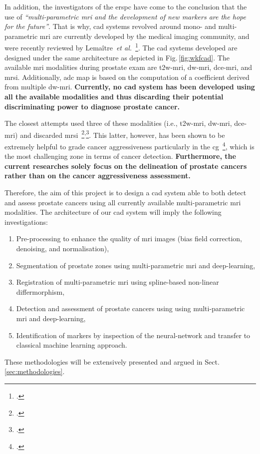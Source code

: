 In addition, the investigators of the \ac{erspc} have come to the conclusion that the use of \emph{``multi-parametric \ac{mri} and the development of new markers are the hope for the future''}.
That is why, \ac{cad} systems revolved around mono- and multi-parametric \ac{mri} are currently developed by the medical imaging community, and were recently reviewed by Lema\^itre~\emph{et al.}~\footcite{Lemaitre2015}.
The \ac{cad} systems developed are designed under the same architecture as depicted in Fig.\,\ref{fig:wkfcad}. 
The available \ac{mri} modalities during prostate exam are \ac{t2w}-\ac{mri}, \ac{dw}-\ac{mri}, \ac{dce}-\ac{mri}, and \ac{mrsi}. 
Additionally, \ac{adc} map is based on the computation of a coefficient derived from multiple \ac{dw}-\ac{mri}.
\textbf{Currently, no \ac{cad} system has been developed using all the available modalities and thus discarding their potential discriminating power to diagnose prostate cancer.}

The closest attempts used three of these modalities (i.e., \ac{t2w}-\ac{mri}, \ac{dw}-\ac{mri}, \ac{dce}-\ac{mri}) and discarded \ac{mrsi}~\footcite{Litjens2014}\textsuperscript{,}\footcite{Viswanath2011}.
This latter, however, has been shown to be extremely helpful to grade cancer aggressiveness particularly in the \ac{cg}~\footcite{Vos2015}, which is the most challenging zone in terms of cancer detection.
\textbf{Furthermore, the current researches solely focus on the delineation of prostate cancers rather than on the cancer aggressiveness assessment.}

Therefore, the aim of this project is to design a \ac{cad} system able to both detect and assess prostate cancers using all currently available multi-parametric \ac{mri} modalities.
The architecture of our \ac{cad} system will imply the following investigations: 
\begin{enumerate}
\item Pre-processing to enhance the quality of \ac{mri} images (bias field correction, denoising, and normalisation),
\item Segmentation of prostate zones using multi-parametric \ac{mri} and deep-learning,
\item Registration of multi-parametric \ac{mri} using spline-based non-linear differmorphism,
\item Detection and assessment of prostate cancers using using multi-parametric \ac{mri} and deep-learning,
\item Identification of markers by inspection of the neural-network and transfer to classical machine learning approach.
\end{enumerate}
These methodologies will be extensively presented and argued in Sect.\,\ref{sec:methodologies}.

